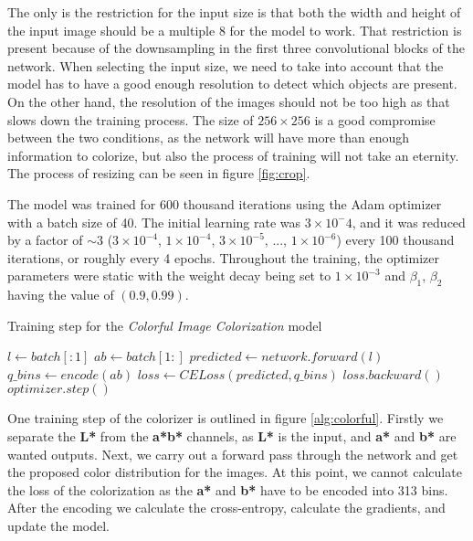 The only is the restriction for the input size is that both the width and height
of the input image should be a multiple $8$ for the model to work. That restriction
is present because of the downsampling in the first three convolutional blocks of
the network. When selecting the input size, we need to take into account that the
model has to have a good enough resolution to detect which objects are present. On 
the other hand, the resolution of the images should not be too high as that slows 
down the training process. The size of $256\times256$ is a good compromise between
the two conditions, as the network will have more than enough information to colorize, 
but also the process of training will not take an eternity. The process of resizing 
can be seen in figure \ref{fig:crop}.

The model was trained for 600 thousand iterations using the Adam optimizer \citep{diederik2015adam}
with a batch size of 40. The initial learning rate was $3\times10^-4$, and it was
reduced by a factor of $\sim$3 ($3\times10^{-4}$, $1\times10^{-4}$, $3\times10^{-5}$,
..., $1\times10^{-6}$) every 100 thousand iterations, or roughly every 4 epochs. 
Throughout the training, the optimizer parameters were static with the weight decay
being set to $1\times10^{-3}$ and $\beta_1$, $\beta_2$ having the value of $(0.9, 0.99)$.

\begin{algorithm}[h!]
	\caption{Training step for the \textit{Colorful Image Colorization} model}
	\label{alg:colorful}
	\begin{algorithmic}		
			\State $l \leftarrow batch[:1]$	
			\State $ab \leftarrow batch[1:]$
			\State $predicted \leftarrow network.forward(l)$	
			\State $q\_bins \leftarrow encode(ab)$
			\State $loss \leftarrow CELoss(predicted, q\_bins)$
			\State $loss.backward()$
			\State $optimizer.step()$
		\EndFunction
	\end{algorithmic}
\end{algorithm}

One training step of the colorizer is outlined in figure \ref{alg:colorful}. 
Firstly we separate the \textbf{L*} from the \textbf{a*b*} channels, as \textbf{L*}
is the input, and \textbf{a*} and \textbf{b*} are wanted outputs. Next, 
we carry out a forward pass through the network and get the proposed color 
distribution for the images. At this point, we cannot calculate the loss of the
colorization as the \textbf{a*} and \textbf{b*} have to be encoded into 313 bins.
After the encoding we calculate the cross-entropy, calculate the gradients, and 
update the model.

